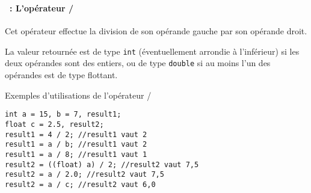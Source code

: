 \begin{frame}[containsverbatim]
  \frametitle{\secname}
  \framesubtitle{\subsecname~: L'opérateur /} 

  Cet opérateur effectue la division de son opérande gauche par son opérande droit. 
  \vspace{0.3cm}
  \par
  La valeur retournée est de type \verb|int| (éventuellement 
  arrondie à l'inférieur) si les deux opérandes sont des entiers, ou de type \verb|double| si au moins l'un des opérandes est de type flottant.
  \vspace{0.3cm}
  {\small\begin{exampleblock}{Exemples d'utilisations de l'opérateur /}
    \begin{verbatim}
int a = 15, b = 7, result1;
float c = 2.5, result2;
result1 = 4 / 2; //result1 vaut 2
result1 = a / b; //result1 vaut 2
result1 = a / 8; //result1 vaut 1
result2 = ((float) a) / 2; //result2 vaut 7,5
result2 = a / 2.0; //result2 vaut 7,5
result2 = a / c; //result2 vaut 6,0\end{verbatim}
  \end{exampleblock}}
\end{frame}

